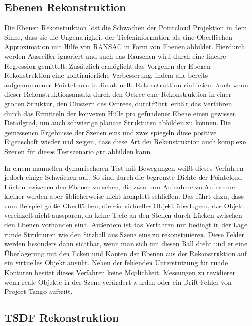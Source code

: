 \subsection*{Ebenen Rekonstruktion}

Die Ebenen Rekonstruktion löst die Schwächen der Pointcloud Projektion in dem Sinne, dass sie die Ungenauigkeit der Tiefeninformation als eine Oberflächen Approximation mit Hilfe von RANSAC in Form von Ebenen abbildet. Hierdurch werden Ausreißer ignoriert und auch das Rauschen wird durch eine lineare Regression gemittelt. Zusätzlich ermöglicht das Vorgehen der Ebenen Rekonstruktion eine kontinuierliche Verbesserung, indem alle bereits aufgenommenen Pointclouds in die aktuelle Rekonstruktion einfließen. Auch wenn dieser Rekonstruktionsansatz durch den Octree eine Rekonstruktion in einer groben Struktur, den Clustern des Octrees, durchführt, erhält das Verfahren durch das Ermitteln der konvexen Hülle pro gefundener Ebene einen gewissen Detailgrad, um auch schwierige planare Strukturen abbilden zu können. Die gemessenen Ergebnisse der Szenen eins und zwei spiegeln diese positive Eigenschaft wieder und zeigen, dass diese Art der Rekonstruktion auch komplexe Szenen für dieses Testszenario gut abbilden kann.

In einem manuellen dynamischeren Test mit Bewegungen weißt dieses Verfahren jedoch einige Schwächen auf. So sind durch die begrenzte Dichte der Pointcloud Lücken zwischen den Ebenen zu sehen, die zwar von Aufnahme zu Aufnahme kleiner werden aber üblicherweise nicht komplett schließen. Das führt dazu, dass zum Beispiel große Oberflächen, die ein virtuelles Objekt überlagern, das Objekt vereinzelt nicht aussparen, da keine Tiefe an den Stellen durch Lücken zwischen den Ebenen vorhanden sind. Außerdem ist das Verfahren nur bedingt in der Lage runde Strukturen wie den Sitzball aus Szene eins zu rekonstruieren. Diese Fehler werden besonders dann sichtbar, wenn man sich um diesen Ball dreht und er eine Überlagerung mit den Ecken und Kanten der Ebenen aus der Rekonstruktion auf ein virtuelles Objekt ausübt. Neben der fehlenden Unterstützung für runde Konturen besitzt dieses Verfahren keine Möglichkeit, Messungen zu revidieren wenn reale Objekte in der Szene verändert wurden oder ein Drift Fehler von Project Tango auftritt.

\subsection*{TSDF Rekonstruktion}


